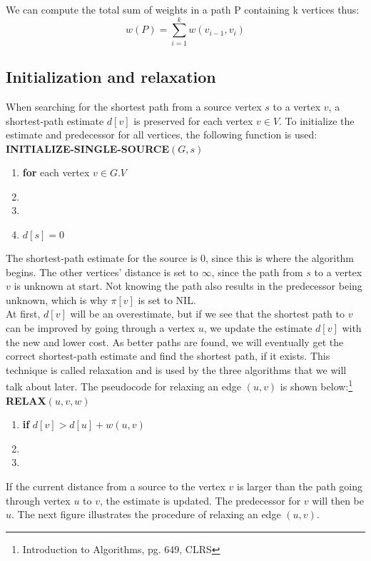 \documentclass[11pt]{article}
\begin{document}
\noindent We can compute the total sum of weights in a path P containing k vertices thus:\\
$$w(P) = \displaystyle\sum_{i=1}^{k} w(v_{i-1},v_i)$$

\noindent
\subsection{Initialization and relaxation}
When searching for the shortest path from a source vertex $s$ to a
vertex $v$, a shortest-path estimate $d[v]$ is preserved for each
vertex $v \in V$. To initialize the estimate and predecessor for all vertices, the following function is used:\\

\textbf{INITIALIZE-SINGLE-SOURCE$(G, s)$}
\begin{enumerate}
\setlength\itemsep{0em}
\item \textbf{for } each vertex $v \in G.V$
\item {}
\item {}
\item $d[s] = 0$
\end{enumerate}
The shortest-path estimate for the source is 0, since this is where the algorithm begins. The other vertices' distance is set to $\infty$, since the path from $s$ to a vertex $v$ is unknown at start. Not knowing the path also results in the predecessor being unknown, which is why $\pi[v]$ is set to NIL.\\
At first, $d[v]$ will be an overestimate, but if we see that the shortest path to $v$ can be improved by going through a vertex $u$, we update the estimate $d[v]$ with the new and lower cost. As better paths are found, we will eventually get the correct shortest-path estimate and find the shortest path, if it exists. This technique is called relaxation and is used by the three algorithms that we will talk about later. The pseudocode for relaxing an edge $(u,v) $ is shown below:\footnote{Introduction to Algorithms, pg. 649, CLRS}\\

\textbf{RELAX$(u, v, w)$}
\begin{enumerate}
\setlength\itemsep{0em}
\item \textbf{if } $d[v] > d[u] + w(u,v)$
\item {}
\item {}
\end{enumerate}
If the current distance from a source to the vertex $v$ is larger than the path going through vertex $u$ to $v$, the estimate is updated. The predecessor for $v$ will then be $u$. The next figure illustrates the procedure of relaxing an edge $(u,v)$.
\end{document}
